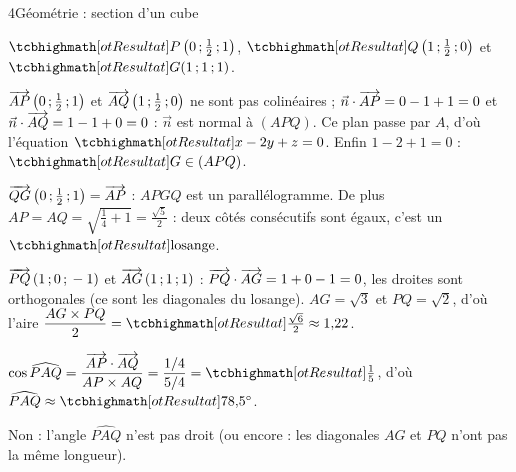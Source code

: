 \begin{corrigeBac}{4}{Géométrie : section d'un cube}
\begin{questions}
  \item $\res{P\left(0\pv\tfrac12\pv1\right)}$, $\res{Q\left(1\pv\tfrac12\pv0\right)}$ et $\res{G(1\pv1\pv1)}$. 
  \item $\overrightarrow{AP}\left(0\,{;}\,\frac12\,{;}\,1\right)$ et $\overrightarrow{AQ}\left(1\,{;}\,\frac12\,{;}\,0\right)$ ne sont pas colinéaires ; $\vec n\cdot\overrightarrow{AP}=0-1+1=0$ et
    $\vec n\cdot\overrightarrow{AQ}=1-1+0=0$ : $\vec n$ est normal à $(APQ)$. Ce plan passe par $A$, d'où l'équation $\res{x-2y+z=0}$. Enfin
    $1-2+1=0$ : $\res{G\in(APQ)}$. \pts{1 pt}
  \item $\overrightarrow{QG}\left(0\,{;}\,\frac12\,{;}\,1\right)=\overrightarrow{AP}$ : $APGQ$ est un parallélogramme. De plus
    $AP=AQ=\sqrt{\frac14+1}=\frac{\sqrt5}{2}$ : deux côtés consécutifs sont égaux, c'est un $\res{\text{losange}}$. 
  \item $\overrightarrow{PQ}\,(1\,{;}\,0\,{;}\,-1)$ et $\overrightarrow{AG}\,(1\,{;}\,1\,{;}\,1)$ : $\overrightarrow{PQ}\cdot\overrightarrow{AG}=1+0-1=0$, les droites sont orthogonales (ce sont les
    diagonales du losange). $AG=\sqrt3$ et $PQ=\sqrt2$, d'où l'aire $\dfrac{AG\times PQ}{2}=\res{\tfrac{\sqrt6}{2}}\approx1{,}22$. 
  \item $\cos\widehat{PAQ}=\dfrac{\vect{AP}\cdot\vect{AQ}}{AP\times AQ}=\dfrac{1/4}{5/4}=\res{\tfrac15}$, d'où
    $\widehat{PAQ}\approx\res{78{,}5^\circ}$. 
  \item Non : l'angle $\widehat{PAQ}$ n'est pas droit (ou encore : les diagonales $AG$ et $PQ$ n'ont pas la même longueur). 
\end{questions}
\end{corrigeBac}

